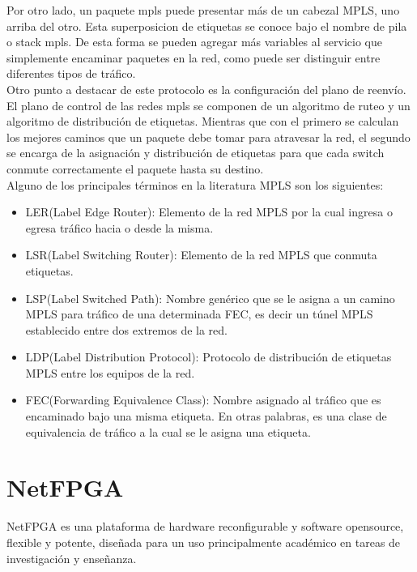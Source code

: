 Por otro lado, un paquete mpls puede presentar más de un cabezal MPLS, uno arriba del otro. Esta superposicion de etiquetas se conoce bajo el nombre de pila o stack mpls. De esta forma se pueden agregar más variables al servicio que simplemente encaminar paquetes en la red, como puede ser distinguir entre diferentes tipos de tráfico.\\

Otro punto a destacar de este protocolo es la configuración del plano de reenvío. El plano de control de las redes mpls se componen de un algoritmo de ruteo y un algoritmo de distribución de etiquetas. Mientras que con el primero se calculan los mejores caminos que un paquete debe tomar para atravesar la red, el segundo se encarga de la asignación y distribución de etiquetas para que cada switch conmute correctamente el paquete hasta su destino.\\

Alguno de los principales términos en la literatura MPLS son los siguientes:

\begin{itemize}
\item LER(Label Edge Router): Elemento de la red MPLS por la cual ingresa o egresa tráfico hacia o desde la misma.
\item LSR(Label Switching Router): Elemento de la red MPLS que conmuta etiquetas.
\item LSP(Label Switched Path): Nombre genérico que se le asigna a un camino MPLS para tráfico de una determinada FEC, es decir un túnel MPLS establecido entre dos extremos de la red.
\item LDP(Label Distribution Protocol): Protocolo de distribución de etiquetas MPLS entre los equipos de la red.
\item FEC(Forwarding Equivalence Class): Nombre asignado al tráfico que es encaminado bajo una misma etiqueta. En otras palabras, es una clase de equivalencia de tráfico a la cual se le asigna una etiqueta.
 
\end{itemize}

\section{NetFPGA}
\label{section2.9}

NetFPGA\cite{NetFPGA1} es una plataforma de hardware reconfigurable y software opensource, flexible y potente, diseñada para un uso principalmente académico en tareas de investigación y enseñanza.\\

